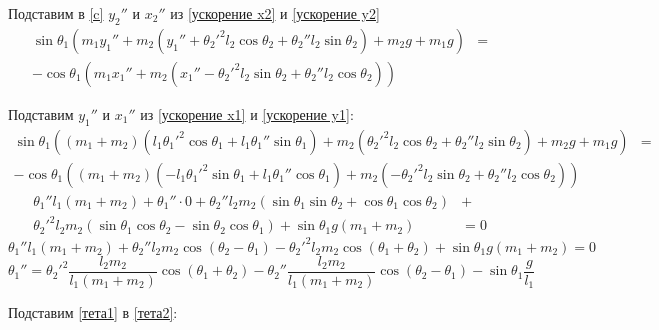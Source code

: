 \documentclass[12pt, a4paper]{article}
\begin{document}
Подставим в \eqref{c} \(y_2''\) и \(x_2''\) из \eqref{ускорение x2} и \eqref{ускорение y2}
\begin{align}
    \sin\theta_1 (m_1y_1'' + m_2(y_1'' + \theta_2'^2 l_2 \cos \theta_2 + \theta_2'' l_2 \sin \theta_2) + m_2g + m_1g) & = \\
    - \cos \theta_1 (m_1x_1'' + m_2(x_1'' - \theta_2'^2 l_2 \sin \theta_2 + \theta_2'' l_2 \cos \theta_2)) \nonumber
\end{align}

Подставим \(y_1''\) и \(x_1''\) из \eqref{ускорение x1} и \eqref{ускорение y1}:
\begin{align*}
    \sin\theta_1 ((m_1 + m_2)(l_1 \theta_1'^2 \cos \theta_1 + l_1 \theta_1'' \sin \theta_1) + m_2(\theta_2'^2 l_2 \cos \theta_2 + \theta_2'' l_2 \sin \theta_2) + m_2g + m_1g) & = \\
    - \cos \theta_1 ((m_1 + m_2)(-l_1 \theta_1'^2 \sin \theta_1 + l_1 \theta_1'' \cos \theta_1) + m_2(- \theta_2'^2 l_2 \sin \theta_2 + \theta_2'' l_2 \cos \theta_2))
\end{align*}
\begin{align*}
    \theta_1''l_1(m_1 + m_2) + \theta_1'' \cdot 0 + \theta_2'' l_2 m_2(\sin \theta_1 \sin \theta_2 + \cos \theta_1 \cos \theta_2) & {}+{} \\
    \theta_2'^2 l_2m_2 (\sin \theta_1 \cos \theta_2 - \sin \theta_2 \cos \theta_1) + \sin \theta_1 g(m_1 + m_2)                   & = 0
\end{align*}
\begin{equation*}
    \theta_1''l_1(m_1 + m_2) + \theta_2'' l_2 m_2 \cos(\theta_2 - \theta_1) - \theta_2'^2 l_2m_2 \cos(\theta_1 + \theta_2) + \sin \theta_1 g(m_1 + m_2) = 0
\end{equation*}
\begin{equation}
    \theta_1'' = \theta_2'^2 \frac{l_2m_2}{l_1(m_1 + m_2)}  \cos(\theta_1 + \theta_2) - \theta_2'' \frac{l_2 m_2}{l_1(m_1 + m_2)} \cos(\theta_2 - \theta_1) - \sin \theta_1 \frac{g}{l_1} \label{тета1}
\end{equation}

Подставим \eqref{тета1} в \eqref{тета2}:
\end{document}

